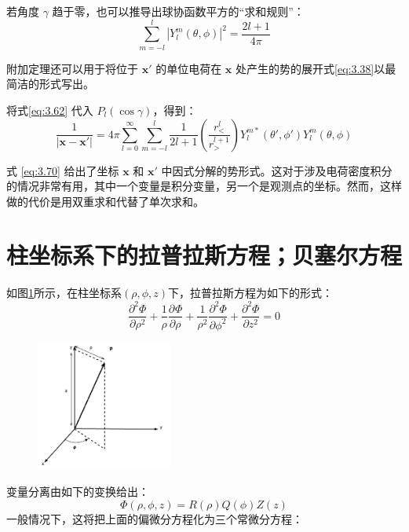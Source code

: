 \documentclass[lang=cn,10pt,newtx,bibend=biber,device=pad]{elegantbook}
\newcommand{\pderi}[3]{\dfrac{\partial^{#1}#2}{\partial {#3}^{#1}}}%
\begin{document}
若角度 $\gamma$ 趋于零，也可以推导出球协函数平方的“求和规则”：
\begin{equation}\label{eq:3.69}
    \sum_{m=-l}^l |Y_l^m(\theta, \phi)|^2 = \frac{2l + 1}{4\pi}     
\end{equation}

附加定理还可以用于将位于 $\mathbf{x}{\prime}$ 的单位电荷在 $\mathbf{x}$ 处产生的势的展开式\ref{eq:3.38}以最简洁的形式写出。

将式\ref{eq:3.62} 代入 $P_l(\cos \gamma)$，得到：
\begin{equation}\label{eq:3.70}
\frac{1}{|\mathbf{x} - \mathbf{x}{\prime}|} = 4\pi \sum_{l=0}^\infty \sum_{m=-l}^l \frac{1}{2l + 1} \left(\frac{r_<^l}{r_>^{l+1}}\right) Y_l^{m*}(\theta{\prime}, \phi{\prime}) Y_l^m(\theta, \phi) 
\end{equation}

式 \ref{eq:3.70} 给出了坐标 $\mathbf{x}$ 和 $\mathbf{x}{\prime}$ 中因式分解的势形式。这对于涉及电荷密度积分的情况非常有用，其中一个变量是积分变量，另一个是观测点的坐标。然而，这样做的代价是用双重求和代替了单次求和。
\section{柱坐标系下的拉普拉斯方程；贝塞尔方程}
如图\ref{fig:cylin_coor}所示，在柱坐标系$(\rho,\phi,z)$下，拉普拉斯方程为如下的形式：
\begin{equation}\label{eq:3.71}
    \pderi{2}{\Phi}{\rho} + \frac{1}{\rho} \pderi{}{\Phi}{\rho} + \frac{1}{\rho^2} \pderi{2}{\Phi}{\phi} + \pderi{2}{\Phi}{z} = 0 
\end{equation}
\begin{figure}[h]
    \centering
    \includegraphics[width=0.4\textwidth]{figure/clyin_coor.png}
    \caption{}
    \label{fig:cylin_coor}
\end{figure}

变量分离由如下的变换给出：
\begin{equation}\label{eq:3.72}
    \Phi(\rho,\phi,z) = R(\rho) Q(\phi) Z(z)
\end{equation}
一般情况下，这将把上面的偏微分方程化为三个常微分方程：
\end{document}
